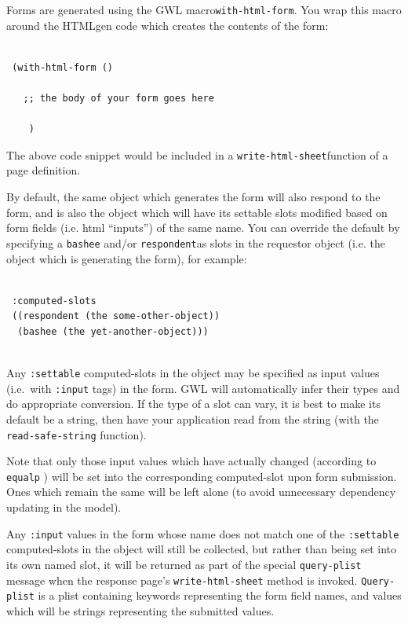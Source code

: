 \documentclass [11pt]{book}
\begin{document}
\label{sec:formhandling}

Forms are generated using the GWL macro\texttt{with-html-form}. You wrap this macro around the HTMLgen code which creates the contents of the form:

\begin{verbatim}

 (with-html-form ()
  
   ;; the body of your form goes here
  
    )
\end{verbatim}The above code snippet would be included in a \texttt{write-html-sheet}function of a page definition.  

By default, the same object which
generates the form will also respond to the form, and is also the
object which will have its settable slots modified based on form
fields (i.e. html ``inputs'') of the same name. You can override the
default by specifying a \texttt{bashee} and/or \texttt{respondent}as slots in the requestor object (i.e. the object which is generating the form), for
example:

\begin{verbatim}

 :computed-slots
 ((respondent (the some-other-object))
  (bashee (the yet-another-object)))


\end{verbatim}Any \texttt{:settable} computed-slots in the object may be specified as input values (i.e.\ with \texttt{:input} tags) in the form. GWL will automatically infer their types
and do appropriate conversion. If the type of a slot can vary, it is best
to make its default be a string, then have your application read from
the string (with the \texttt{read-safe-string} function).

Note that only those input values which have actually changed
 (according to \texttt{equalp} ) will be set into the corresponding computed-slot upon form submission. 
Ones which remain the same will be left alone (to avoid unnecessary dependency 
updating in the model).

Any \texttt{:input} values in the form whose name does not match one of the \texttt{:settable} computed-slots in the object will still be collected, but rather than being set into
 its own named slot, it will be returned as part of the special \texttt{query-plist} message when the response page's \texttt{write-html-sheet} method is invoked. \texttt{Query-plist} is a plist containing keywords representing the form field names, and 
values which will be strings representing the submitted values.
\end{document}
